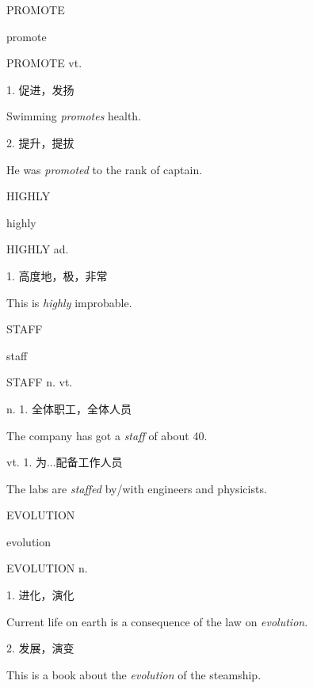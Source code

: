 \begin{flashcard}{
PROMOTE

promote
}
\begin{center}
PROMOTE vt. 
\end{center}
1. 促进，发扬

Swimming \textit{promotes} health.

2. 提升，提拔

He was \textit{promoted} to the rank of captain.

\end{flashcard}
\begin{flashcard}{
HIGHLY

highly
}
\begin{center}
HIGHLY ad. 
\end{center}
1. 高度地，极，非常

This is \textit{highly} improbable.

\end{flashcard}
\begin{flashcard}{
STAFF

staff
}
\begin{center}
STAFF n. vt. 
\end{center}
n. 1. 全体职工，全体人员

The company has got a \textit{staff} of about 40.

vt. 1. 为...配备工作人员

The labs are \textit{staffed} by/with engineers and physicists.

\end{flashcard}
\begin{flashcard}{
EVOLUTION

evolution
}
\begin{center}
EVOLUTION n. 
\end{center}
1. 进化，演化

Current life on earth is a consequence of the law on \textit{evolution}.

2. 发展，演变

This is a book about the \textit{evolution} of the steamship.

\end{flashcard}
